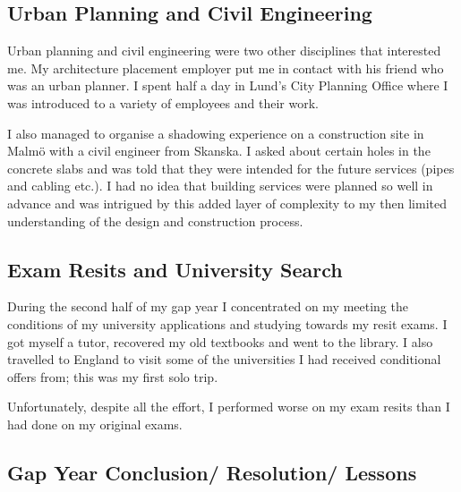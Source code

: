 




\subsection{Urban Planning and Civil Engineering}

Urban planning and civil engineering were two other disciplines that interested me.
My architecture placement employer put me in contact with his friend who was an urban planner.
I spent half a day in Lund's City Planning Office where I was introduced to a variety of employees and their work.

I also managed to organise a shadowing experience on a construction site in Malmö with a civil engineer from Skanska.
I asked about certain holes in the concrete slabs and was told that they were intended for the future services (pipes and cabling etc.).
I had no idea that building services were planned so well in advance and was intrigued by this added layer of complexity to my then limited understanding of the design and construction process.




\subsection{Exam Resits and University Search}

During the second half of my gap year I concentrated on my meeting the conditions of my university applications and studying towards my resit exams.
I got myself a tutor, recovered my old textbooks and went to the library.
I also travelled to England to visit some of the universities I had received conditional offers from; this was my first solo trip.

Unfortunately, despite all the effort, I performed worse on my exam resits than I had done on my original exams.



\subsection{Gap Year Conclusion/ Resolution/ Lessons}

